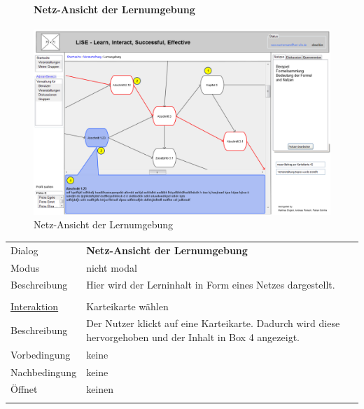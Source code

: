 \documentclass[12pt,a4paper]{article}
\begin{document}
{\begin{figure}[H]
	\paragraph{Netz-Ansicht der Lernumgebung}
	\includegraphics[width=\textwidth]{Bilder/Mockups/GUI/NetzAnsichtKarteikarten.png}
	\caption{Netz-Ansicht der Lernumgebung}
	\label{GuiNetzAnsichtKarteikarten}
\end{figure}
\begin{tabular}{l p{12cm}}
	Dialog 	 & \textbf{Netz-Ansicht der Lernumgebung} \\ 
	Modus & nicht modal\\ 
	Beschreibung   	& Hier wird der Lerninhalt in Form eines Netzes dargestellt. \\\\
	
	\underline{Interaktion} 	 & Karteikarte wählen\\ 
	Beschreibung   	& Der Nutzer klickt auf eine Karteikarte. Dadurch wird diese hervorgehoben und der Inhalt in Box 4 angezeigt.\\
	Vorbedingung	& keine \\
	Nachbedingung	& keine \\
	Öffnet			& keinen\\\\
\end{tabular}

\begin{figure}[H]
	\centering

\end{figure}}
\end{document}
